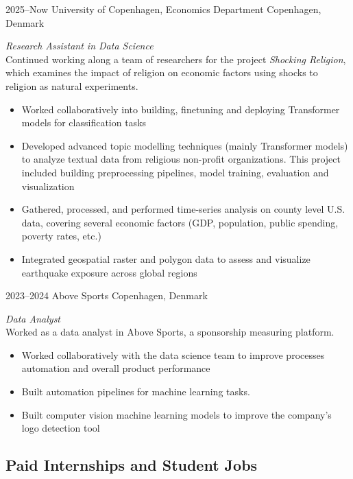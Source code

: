 \documentclass[]{friggeri-cv-a4}
\begin{document}
\begin{entrylist}


\entry
{2025--Now}
{University of Copenhagen, Economics Department}
{Copenhagen, Denmark}
{\emph{Research Assistant in Data Science} \\
Continued working along a team of researchers for the project \emph{Shocking Religion}, which examines the impact of religion on economic factors using shocks to religion as natural experiments. \\
\begin{itemize}
\item Worked collaboratively into building, finetuning and deploying Transformer models for classification tasks
\item Developed advanced topic modelling techniques (mainly Transformer models) to analyze textual data from religious non-profit organizations. This project included building preprocessing pipelines, model training, evaluation and visualization
\item Gathered, processed, and performed time-series analysis on county level U.S. data, covering several economic factors (GDP, population, public spending, poverty rates, etc.)
\item Integrated geospatial raster and polygon data to assess and visualize earthquake exposure across global regions
\end{itemize}}


\entry
{2023--2024}
{Above Sports}
{Copenhagen, Denmark}
{\emph{Data Analyst} \\
Worked as a data analyst in Above Sports, a sponsorship measuring platform.
\begin{itemize}
\item Worked collaboratively with the data science team to improve processes automation and overall product performance
\item Built automation pipelines for machine learning tasks.
\item Built computer vision machine learning models to improve the company's logo detection tool
\end{itemize}}


\end{entrylist}

\subsection{Paid Internships and Student Jobs}
\end{document}
